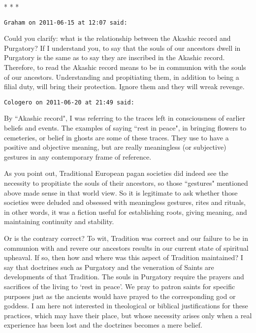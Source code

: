 
\begin{center}* * *\end{center}

\begin{footnotesize}\begin{sffamily}



\texttt{Graham on 2011-06-15 at 12:07 said: }

Could you clarify: what is the relationship between the Akashic record and Purgatory? If I understand you, to say that the souls of our ancestors dwell in Purgatory is the same as to say they are inscribed in the Akashic record. Therefore, to read the Akashic record means to be in communion with the souls of our ancestors. Understanding and propitiating them, in addition to being a filial duty, will bring their protection. Ignore them and they will wreak revenge.


\hfill

\texttt{Cologero on 2011-06-20 at 21:49 said: }

By ``Akashic record", I was referring to the traces left in consciousness of earlier beliefs and events. The examples of saying ``rest in peace", in bringing flowers to cemeteries, or belief in ghosts are some of these traces. They use to have a positive and objective meaning, but are really meaningless (or subjective) gestures in any contemporary frame of reference.

As you point out, Traditional European pagan societies did indeed see the necessity to propitiate the souls of their ancestors, so those ``gestures" mentioned above made sense in that world view. So it is legitimate to ask whether those societies were deluded and obsessed with meaningless gestures, rites and rituals, in other words, it was a fiction useful for establishing roots, giving meaning, and maintaining continuity and stability.

Or is the contrary correct? To wit, Tradition was correct and our failure to be in communion with and revere our ancestors results in our current state of spiritual upheaval. If so, then how and where was this aspect of Tradition maintained? I say that doctrines such as Purgatory and the veneration of Saints are developments of that Tradition. The souls in Purgatory require the prayers and sacrifices of the living to `rest in peace'. We pray to patron saints for specific purposes just as the ancients would have prayed to the corresponding god or goddess. I am here not interested in theological or biblical justifications for these practices, which may have their place, but whose necessity arises only when a real experience has been lost and the doctrines becomes a mere belief.


\end{sffamily}
\end{footnotesize}
